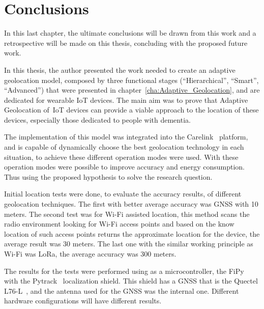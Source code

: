 \chapter{Conclusions}
\label{cha:Conclusions}

In this last chapter, the ultimate conclusions will be drawn from this work and a retrospective will be made on this thesis, concluding with the proposed future work.

In this thesis, the author presented the work needed to create an adaptive geolocation model, composed by three functional stages (“Hierarchical”, “Smart”, “Advanced”) that were presented in chapter~\ref{cha:Adaptive_Geolocation}, and are dedicated for wearable IoT devices. The main aim was to prove that Adaptive Geolocation of~\gls{IoT} devices can provide a viable approach to the location of these devices, especially those dedicated to people with dementia.

The implementation of this model was integrated into the Carelink~\cite{carelink} platform, and is capable of dynamically choose the best geolocation technology in each situation, to achieve these different operation modes were used. With these operation modes were possible to improve accuracy and energy consumption. Thus using the proposed hypothesis to solve the research question.

Initial location tests were done, to evaluate the accuracy results, of different geolocation techniques. The first with better average accuracy was GNSS with 10 meters. The second test was for Wi-Fi assisted location, this method scans the radio environment looking for Wi-Fi
access points and based on the know location of such access points returns the approximate location for the device, the average result was 30 meters. The last one with the similar working principle as Wi-Fi was LoRa, the average accuracy was 300 meters.

The results for the tests were performed using as a microcontroller, the FiPy~\cite{Fipy} with the Pytrack~\cite{PytrackSpecs} localization shield. This shield has a GNSS that is the Quectel L76-L~\cite{quectelspecs}, and the antenna used for the GNSS was the internal one. Different hardware configurations will have different results.

